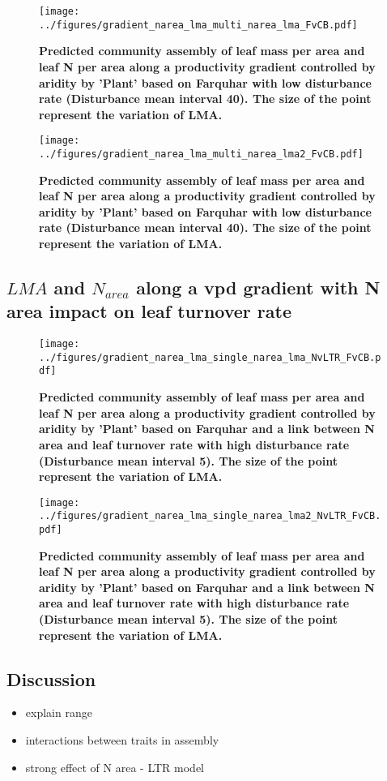 \documentclass[a4paper,11pt]{article}
\begin{document}
\begin{figure}[ht]
\centering
\texttt{[image: ../figures/gradient\_narea\_lma\_multi\_narea\_lma\_FvCB.pdf]}
\caption{\textbf{Predicted community assembly of leaf mass per area and leaf N per area along a productivity gradient controlled by aridity by 'Plant' based on Farquhar with low disturbance rate (Disturbance mean interval 40). The size of the point represent the variation of LMA.}
\label{fig:lma_nareaFl}}
\end{figure}

\begin{figure}[ht]
\centering
\texttt{[image: ../figures/gradient\_narea\_lma\_multi\_narea\_lma2\_FvCB.pdf]}
\caption{\textbf{Predicted community assembly of leaf mass per area and leaf N per area along a productivity gradient controlled by aridity by 'Plant' based on Farquhar with low disturbance rate (Disturbance mean interval 40). The size of the point represent the variation of LMA.}
\label{fig:lma_nareaFl2}}
\end{figure}


\clearpage

\subsection{$LMA$ and $N_{area}$ along a vpd gradient with N area impact on leaf turnover rate}


\begin{figure}[ht]
\centering
\texttt{[image: ../figures/gradient\_narea\_lma\_single\_narea\_lma\_NvLTR\_FvCB.pdf]}
\caption{\textbf{Predicted community assembly of leaf mass per area and leaf N per area along a productivity gradient controlled by aridity by 'Plant' based on Farquhar and a link between N area and leaf turnover rate with high disturbance rate (Disturbance mean interval 5). The size of the point represent the variation of LMA.}
\label{fig:lma_nareaFh}}
\end{figure}

\begin{figure}[ht]
\centering
\texttt{[image: ../figures/gradient\_narea\_lma\_single\_narea\_lma2\_NvLTR\_FvCB.pdf]}
\caption{\textbf{Predicted community assembly of leaf mass per area and leaf N per area along a productivity gradient controlled by aridity by 'Plant' based on Farquhar and a link between N area and leaf turnover rate with high disturbance rate (Disturbance mean interval 5). The size of the point represent the variation of LMA.}
\label{fig:lma_nareaFh2}}
\end{figure}



\clearpage

\subsection{Discussion}



\begin{itemize}

\item explain range

\item interactions between traits in assembly

\item strong effect of N area - LTR model

\end{itemize}






\end{document}
